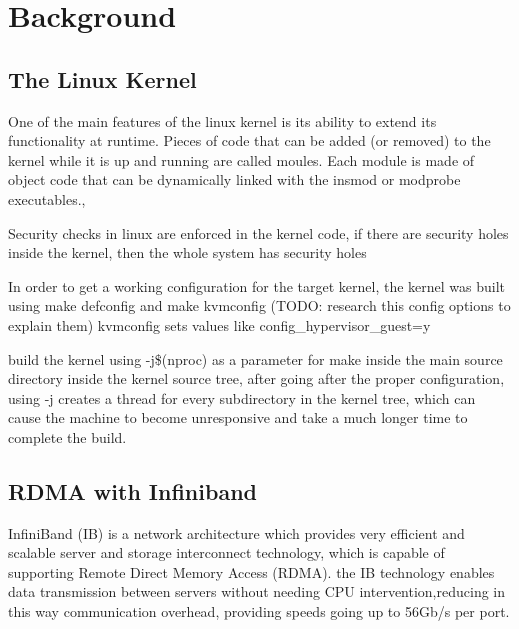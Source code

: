 \section{Background}


\subsection{The Linux Kernel}


One of the main features of the linux kernel is its ability to extend 
its functionality at runtime. Pieces of code that can be added (or removed) to the kernel 
while it is up and running are called moules. Each module is made of object code that can 
be dynamically linked with the insmod or modprobe executables.\cite{ldd3}, 


Security checks in linux are enforced in the kernel code, if there are security holes inside
the kernel, then the whole system has security holes \cite{ldd3}


In order to get a working configuration for the target kernel, the kernel was built using make 
defconfig and make kvmconfig (TODO: research this config options to explain them)
kvmconfig sets values like config\_hypervisor\_guest=y

build the kernel using -j\$(nproc) as a parameter for make inside the main source directory
inside the kernel source tree, after going after the proper configuration, using -j creates a 
thread for every subdirectory in the kernel tree, which can cause the machine to become 
unresponsive and take a much longer time to complete the build. \cite{kroah-hartman06}

\subsection{RDMA with Infiniband}

InfiniBand (IB) is a network architecture which provides very efficient and scalable server and storage interconnect
technology, which is capable of supporting Remote Direct Memory Access (RDMA). the IB technology enables data 
transmission between servers without needing CPU intervention,reducing in this way communication overhead, providing 
speeds going up to 56Gb/s per port\cite{rdmamanual}.

